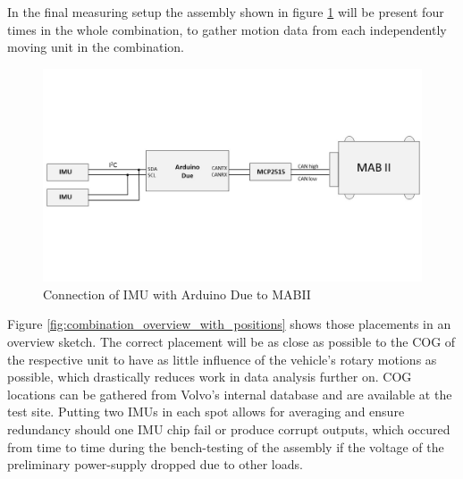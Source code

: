 \documentclass[ExampleMasters.tex]{subfiles}
\begin{document}
In the final measuring setup the assembly shown in figure \ref{fig:IMU_overview} will be present four times in the whole combination, to gather motion data from each independently moving unit in the combination. 

\begin{figure}[!htb]
	\centering
	\includegraphics[width=1\linewidth]{figures/IMU_overview}
	\caption[Connection of \acrshort{IMU} with Arduino Due to \acrshort{MABII}]{Connection of \gls{IMU} with Arduino Due to \gls{MABII}}
	\label{fig:IMU_overview}
\end{figure}


Figure \ref{fig:combination_overview_with_positions} shows those placements in an overview sketch. The correct placement will be as close as possible to the \gls{COG} of the respective unit to have as little influence of the vehicle's rotary motions as possible, which drastically reduces work in  data analysis further on. \gls{COG}  locations can be gathered from Volvo's internal database and are available at the test site. Putting two \gls{IMU}s in each spot allows for averaging and ensure redundancy should one \gls{IMU} chip fail or produce corrupt outputs, which occured from time to time during the bench-testing of the assembly if the voltage of the preliminary power-supply dropped due to other loads.\\
\end{document}
